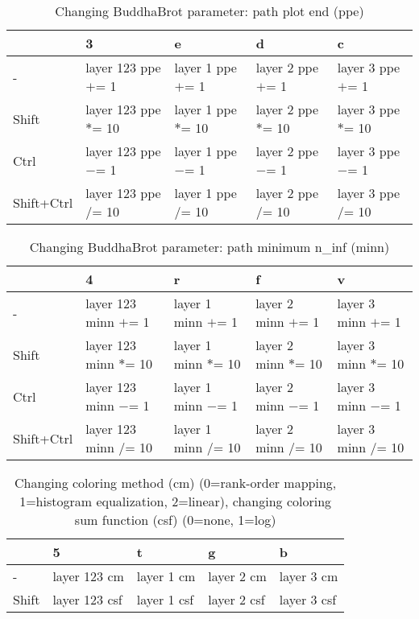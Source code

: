 \documentclass[10pt,a4paper]{article}
\begin{document}
\begin{table}[h!]
    \caption{Changing BuddhaBrot parameter: path plot end (ppe)}
    \setlength{\tabcolsep}{0.0pt}
    \begin{tabularx}{\linewidth}{LLLLL}
        \toprule
                   & 3                      & e                    & d                    & c                    \\
        \midrule
        -          & layer 123 ppe $+$= 1  & layer 1 ppe $+$= 1  & layer 2 ppe $+$= 1  & layer 3 ppe $+$= 1  \\
        Shift      & layer 123 ppe $*$= 10 & layer 1 ppe $*$= 10 & layer 2 ppe $*$= 10 & layer 3 ppe $*$= 10 \\
        Ctrl       & layer 123 ppe $-$= 1  & layer 1 ppe $-$= 1  & layer 2 ppe $-$= 1  & layer 3 ppe $-$= 1  \\
        Shift+Ctrl & layer 123 ppe $/$= 10 & layer 1 ppe $/$= 10 & layer 2 ppe $/$= 10 & layer 3 ppe $/$= 10 \\
        \bottomrule
    \end{tabularx}
\end{table}

\begin{table}[h!]
    \caption{Changing BuddhaBrot parameter: path minimum n\_inf (minn)}
    \setlength{\tabcolsep}{0.0pt}
    \begin{tabularx}{\linewidth}{LLLLL}
        \toprule
                   & 4                      & r                    & f                    & v                    \\
        \midrule
        -          & layer 123 minn $+$= 1  & layer 1 minn $+$= 1  & layer 2 minn $+$= 1  & layer 3 minn $+$= 1  \\
        Shift      & layer 123 minn $*$= 10 & layer 1 minn $*$= 10 & layer 2 minn $*$= 10 & layer 3 minn $*$= 10 \\
        Ctrl       & layer 123 minn $-$= 1  & layer 1 minn $-$= 1  & layer 2 minn $-$= 1  & layer 3 minn $-$= 1  \\
        Shift+Ctrl & layer 123 minn $/$= 10 & layer 1 minn $/$= 10 & layer 2 minn $/$= 10 & layer 3 minn $/$= 10 \\
        \bottomrule
    \end{tabularx}
\end{table}

\begin{table}[h!]
    \caption{Changing coloring method (cm) (0=rank-order mapping, 1=histogram equalization, 2=linear), changing coloring sum function (csf) (0=none, 1=log)}
    \setlength{\tabcolsep}{0.0pt}
    \begin{tabularx}{\linewidth}{LLLLL}
        \toprule
                   & 5             & t           & g           & b           \\
        \midrule
        -          & layer 123 cm  & layer 1 cm  & layer 2 cm  & layer 3 cm  \\
        Shift      & layer 123 csf & layer 1 csf & layer 2 csf & layer 3 csf \\
        \bottomrule
    \end{tabularx}
\end{table}
\end{document}
